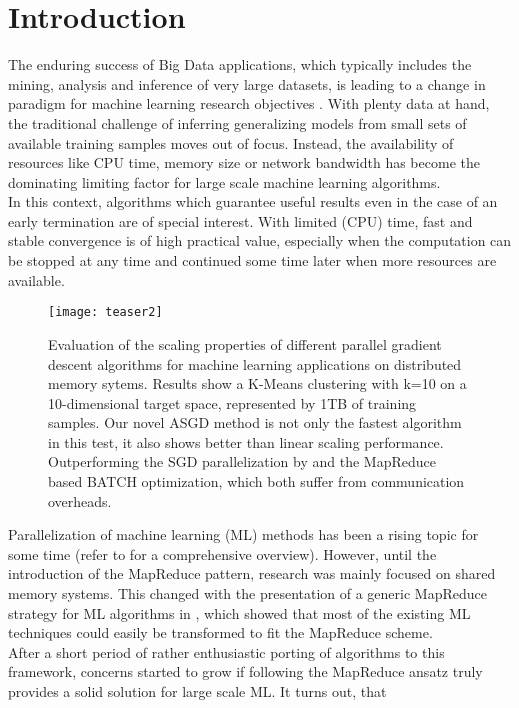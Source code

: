 \documentclass{acm_proc_article-sp}
\begin{document}
\section{Introduction}
The enduring success of Big Data applications, which typically includes 
the mining, analysis and inference of very large datasets, is leading to a change 
in paradigm for machine learning research objectives \cite{bottou2008tradeoffs}. 
With plenty data at hand, the traditional challenge of inferring generalizing 
models from small sets of available training samples moves out of focus. Instead,
the availability of resources like CPU time, memory size or network bandwidth 
has become the dominating limiting factor for large scale machine learning
algorithms.\\
In this context, algorithms which guarantee useful results even in the case
of an early termination are of special interest. With limited (CPU) time,
fast and stable convergence is of high practical value, especially when the 
computation can be stopped at any time and continued some time later when more
resources are available.\\   
\begin{figure}[t]
\texttt{[image: teaser2]}
\caption{
Evaluation of the scaling properties of different parallel gradient
descent algorithms for machine learning applications on distributed memory sytems. 
Results show a  
K-Means clustering
with k=10 on a  10-dimensional target space, represented by 1TB 
of training 
samples. Our novel ASGD method is not only the fastest algorithm in this test,
it also shows better than linear scaling performance. Outperforming the 
SGD parallelization by \cite{SGDsmola} and 
the MapReduce based BATCH \cite{chu2007map} optimization,
which both suffer from communication overheads.  
}
\end{figure}
\noindent Parallelization of machine learning (ML) methods has been a 
rising topic for some time (refer to \cite{datamining} for a comprehensive
overview). However, until the introduction of the MapReduce pattern, 
research was mainly focused on shared memory systems. This changed with
the presentation of a generic MapReduce strategy for ML algorithms in
\cite{chu2007map}, which showed that most of the existing ML techniques
could easily be transformed to fit the MapReduce scheme.\\   
After a short period of rather enthusiastic porting of algorithms to this 
framework, concerns started to grow if following the MapReduce ansatz 
truly provides a solid solution for large scale ML. It turns out, that 
\end{document}
